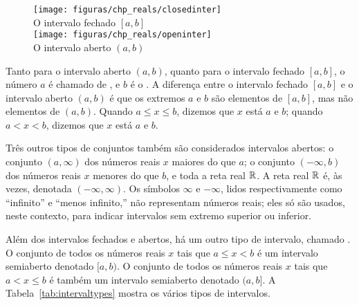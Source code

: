 \documentclass{svmono}
\begin{document}
\begin{figure}
\begin{center}
\texttt{[image: figuras/chp\_reals/closedinter]}\\
O intervalo fechado $[a,b]$\\[\baselineskip]
\texttt{[image: figuras/chp\_reals/openinter]}\\
O intervalo aberto $(a,b)$
\end{center}
\caption{}
\label{fig:intervals}
\end{figure}

Tanto para o intervalo aberto $(a,b)$, quanto para o intervalo
fechado $[a,b]$, o número $a$ é chamado de
,
e $b$ é o . A diferença entre o
intervalo fechado $[a,b]$ e o intervalo aberto $(a,b)$ é que os extremos $a$
e $b$ são elementos de $[a,b]$, mas não elementos de $(a,b)$. Quando
$a \le x \le b$, dizemos que $x$ está  $a$ e $b$; quando
$a < x < b$, dizemos que $x$ está  $a$ e $b$.

Três outros tipos de conjuntos também são considerados intervalos
abertos: o conjunto $(a,\infty)$ dos números reais $x$ maiores do que $a$;
o conjunto $(-\infty,b)$ dos números reais $x$ menores do que $b$,
e toda a reta real $\mathbb{R}$. A reta real $\mathbb{R}$ é, às vezes, denotada
$(-\infty,\infty)$. Os símbolos $\infty$ e $-\infty$, lidos respectivamente
como ``infinito''  e ``menos infinito,'' não representam números reais; eles
só são usados, neste contexto, para indicar intervalos sem extremo
superior ou inferior.

Além dos intervalos fechados e abertos, há um outro tipo de intervalo,
chamado . O conjunto
de todos os números
reais $x$ tais que $a \le x < b$ é um intervalo semiaberto denotado
$[a,b)$. O conjunto de todos os números reais $x$ tais que $a < x \le b$
é também um intervalo semiaberto denotado $(a,b]$.
A Tabela~\ref{tab:intervaltypes} mostra os vários tipos de intervalos.
\end{document}
